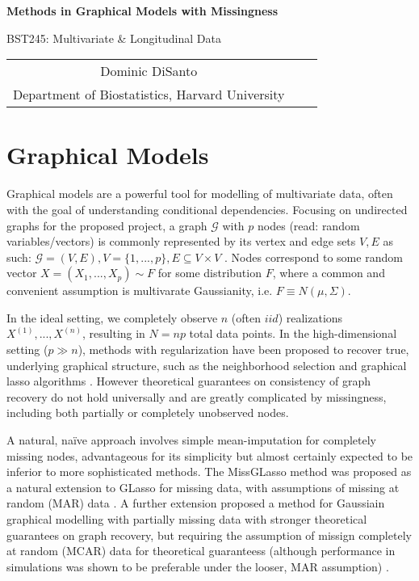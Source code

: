 \documentclass[11pt,twoside]{article}
\newcommand{\G}{\mathcal{G}}
\begin{document}
\begin{center}


{\bf{\LARGE{Methods in Graphical Models with Missingness}}}    

    \vspace*{.1in}    

BST245: Multivariate \& Longitudinal Data 

    \vspace*{.2in}

\begin{tabular}{ccc}
Dominic DiSanto  \\
Department of Biostatistics, Harvard University 
\end{tabular}

\end{center}


\section{Graphical Models}

Graphical models are a powerful tool for modelling of multivariate data, often with the goal of understanding conditional dependencies. Focusing on undirected graphs for the proposed project, a graph $\G$ with $p$ nodes (read: random variables/vectors) is commonly represented by its vertex and edge sets $V, E$ as such: $\G = (V,E), V=\{1, ..., p\}, E \subseteq V \times V$ \cite{meinshausen_high-dimensional_2006}. Nodes correspond to some random vector $X = (X_1, ..., X_p) \sim F$ for some distribution $F$, where a common and convenient assumption is multivarate Gaussianity, i.e. $ F \equiv N(\mu, \Sigma)$. 

In the ideal setting, we completely observe $n$ (often $iid$) realizations $X^{(1)}, ..., X^{(n)}$, resulting in $N = np$ total data points. In the high-dimensional setting ($p\gg n$), methods with regularization have been proposed to recover true, underlying graphical structure, such as the neighborhood selection \cite{meinshausen_high-dimensional_2006} and graphical lasso algorithms \cite{friedman_sparse_2008}. However theoretical guarantees on consistency of graph recovery do not hold universally \cite{meinshausen_note_2008} and are greatly complicated by missingness, including both partially or completely unobserved nodes. 

A natural, na\"ive approach involves simple mean-imputation for completely missing nodes, advantageous for its simplicity but almost certainly expected to be inferior to more sophisticated methods. The MissGLasso method was proposed as a natural extension to GLasso for missing data, with assumptions of missing at random (MAR) data \cite{stadler_missing_2010}. A further extension proposed a method for Gaussiain graphical modelling with partially missing data with stronger theoretical guarantees on graph recovery, but requiring the assumption of missign completely at random (MCAR) data for theoretical guaranteess (although performance in simulations was shown to be preferable under the looser, MAR assumption) \cite{kolar_estimating_2012}.
\end{document}
